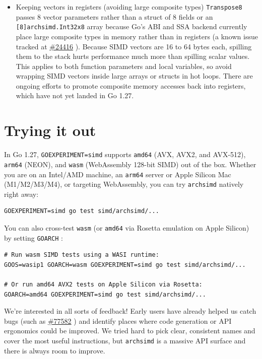 \documentclass[11pt,a4paper]{article}
\begin{document}
\begin{itemize}
\item Keeping vectors in registers (avoiding large composite types) \texttt{Transpose8} passes 8 vector parameters rather than a struct of 8 fields or an \texttt{[8]archsimd.Int32x8} array because Go's ABI and SSA backend currently place large composite types in memory rather than in registers (a known issue tracked at \href{https://go.dev/issue/24416}{\#24416} ). Because SIMD vectors are 16 to 64 bytes each, spilling them to the stack hurts performance much more than spilling scalar values. This applies to both function parameters and local variables, so avoid wrapping SIMD vectors inside large arrays or structs in hot loops. There are ongoing efforts to promote composite memory accesses back into registers, which have not yet landed in Go 1.27.
\end{itemize}

\section{Trying it out}

In Go 1.27, \texttt{GOEXPERIMENT=simd} supports \texttt{amd64} (AVX, AVX2, and AVX-512), \texttt{arm64} (NEON), and \texttt{wasm} (WebAssembly 128-bit SIMD) out of the box. Whether you are on an Intel/AMD machine, an \texttt{arm64} server or Apple Silicon Mac (M1/M2/M3/M4), or targeting WebAssembly, you can try \texttt{archsimd} natively right away:

\begin{verbatim}
GOEXPERIMENT=simd go test simd/archsimd/...
\end{verbatim}

You can also cross-test \texttt{wasm} (or \texttt{amd64} via Rosetta emulation on Apple Silicon) by setting \texttt{GOARCH} :

\begin{verbatim}
# Run wasm SIMD tests using a WASI runtime:
GOOS=wasip1 GOARCH=wasm GOEXPERIMENT=simd go test simd/archsimd/...

# Or run amd64 AVX2 tests on Apple Silicon via Rosetta:
GOARCH=amd64 GOEXPERIMENT=simd go test simd/archsimd/...
\end{verbatim}

We're interested in all sorts of feedback! Early users have already helped us catch bugs (such as \href{https://go.dev/issue/77582}{\#77582} ) and identify places where code generation or API ergonomics could be improved. We tried hard to pick clear, consistent names and cover the most useful instructions, but \texttt{archsimd} is a massive API surface and there is always room to improve.
\end{document}
